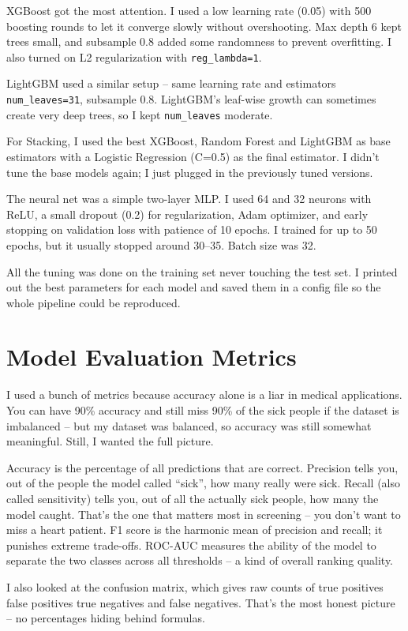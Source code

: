 \documentclass[12pt, a4paper, oneside]{book}
\begin{document}
XGBoost got the most attention. I used a low learning rate (0.05) with 500 boosting rounds to let it converge slowly without overshooting. Max depth 6 kept trees small, and subsample 0.8 added some randomness to prevent overfitting. I also turned on L2 regularization with \texttt{reg\_lambda=1}.

LightGBM used a similar setup -- same learning rate and estimators \texttt{num\_leaves=31}, subsample 0.8. LightGBM's leaf-wise growth can sometimes create very deep trees, so I kept \texttt{num\_leaves} moderate.

For Stacking, I used the best XGBoost, Random Forest and LightGBM as base estimators with a Logistic Regression (C=0.5) as the final estimator. I didn't tune the base models again; I just plugged in the previously tuned versions.

The neural net was a simple two-layer MLP. I used 64 and 32 neurons with ReLU, a small dropout (0.2) for regularization, Adam optimizer, and early stopping on validation loss with patience of 10 epochs. I trained for up to 50 epochs, but it usually stopped around 30--35. Batch size was 32.

All the tuning was done on the training set never touching the test set. I printed out the best parameters for each model and saved them in a config file so the whole pipeline could be reproduced.

\section{Model Evaluation Metrics}
I used a bunch of metrics because accuracy alone is a liar in medical applications. You can have 90\% accuracy and still miss 90\% of the sick people if the dataset is imbalanced -- but my dataset was balanced, so accuracy was still somewhat meaningful. Still, I wanted the full picture.

Accuracy is the percentage of all predictions that are correct. Precision tells you, out of the people the model called ``sick'', how many really were sick. Recall (also called sensitivity) tells you, out of all the actually sick people, how many the model caught. That's the one that matters most in screening -- you don't want to miss a heart patient. F1 score is the harmonic mean of precision and recall; it punishes extreme trade-offs. ROC-AUC measures the ability of the model to separate the two classes across all thresholds -- a kind of overall ranking quality.

I also looked at the confusion matrix, which gives raw counts of true positives false positives true negatives and false negatives. That's the most honest picture -- no percentages hiding behind formulas.
\end{document}
